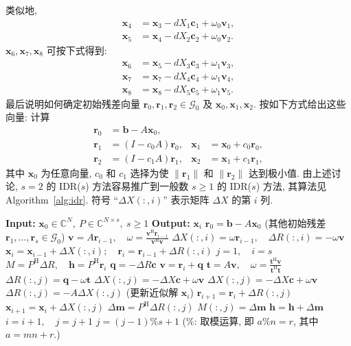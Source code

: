 {类似地,}
\[\begin{aligned}\bm x_4&=\bm x_3-dX_1\bm c_1+\omega_0\bm v_1,\\\bm x_5&=\bm x_4-dX_2\bm c_2+\omega_0\bm v_2.\end{aligned}\]
{$\bm x_6,\bm x_7,\bm x_8$ 可按下式得到:}
\[\begin{aligned}\bm x_6&=\bm x_5-dX_3\bm c_3+\omega_1\bm v_3,\\\bm x_7&=\bm x_7-dX_4\bm c_4+\omega_1\bm v_4,\\\bm x_8&=\bm x_8-dX_5\bm c_5+\omega_1\bm v_5.\end{aligned}\]
{最后说明如何确定初始残差向量 $\bm r_0,\bm r_1,\bm r_2\in\mathcal G_0$ 及 $\bm x_0,\bm x_1,\bm x_2$. 按如下方式给出这些向量: 计算}
\[\begin{aligned}\bm r_0&=\bm b-A\bm x_0,\\\bm r_1&=(I-c_0A)\bm r_0,&\bm x_1&=\bm x_0+c_0\bm r_0,\\\bm r_2&=(I-c_1A)\bm r_1,&\bm x_2&=\bm x_1+c_1\bm r_1,\end{aligned}\]
{其中 $\bm x_0$ 为任意向量, $c_0$ 和 $c_1$ 选择为使 $\|\bm r_1\|$ 和 $\|\bm r_2\|$ 达到极小值.}
{由上述讨论, $s=2$ 的 IDR($s$) 方法容易推广到一般数 $s\ge1$ 的 IDR($s$) 方法, 其算法见 Algorithm\ \ref{alg:idr}. 符号 ``$\Delta X(:,i)$'' 表示矩阵 $\Delta X$ 的第 $i$ 列.}
\begin{algorithm}[H]\caption{{IDR($s$) 方法}}\label{alg:idr}\begin{algorithmic}[1]
\Statex\textbf{Input:} $\bm x_0\in\mathbb C^N,\ P\in\mathbb C^{N\times s},\ s\ge1$
\Statex\textbf{Output:} $\bm x_i$
\State $\bm r_0=\bm b-A\bm x_0$
\Statex ({其他初始残差 $\bm r_1,\ldots,\bm r_s\in\mathcal G_0$})
\State $\bm v=A\bm r_{i-1},\quad\omega=\frac{\bm v^{\mathrm H}\bm r_{i-1}}{\bm v^{\mathrm H}\bm v}$
\State $\Delta X(:,i)=\omega\bm r_{i-1},\quad\Delta R(:,i)=-\omega\bm v$
\State $\bm x_i=\bm x_{i-1}+\Delta X(:,i);\quad\bm r_i=\bm r_{i-1}+\Delta R(:,i)$
\EndFor
\State $j=1,\quad i=s$
\State $M=P^{\mathrm H}\Delta R,\quad\bm h=P^{\mathrm H}\bm r_i$
\State $\bm q=-\Delta R\bm c$
\State $\bm v=\bm r_i+\bm q$
\State $\bm t=A\bm v,\quad\omega=\frac{\bm t^{\mathrm H}\bm v}{\bm t^{\mathrm H}\bm t}$
\State $\Delta R(:,j)=\bm q-\omega\bm t$
\State $\Delta X(:,j)=-\Delta X\bm c+\omega\bm v$
\Else
\State $\Delta X(:,j)=-\Delta X\bm c+\omega\bm v$
\State $\Delta R(:,j)=-A\Delta X(:,j)$
\EndIf
\Statex ({更新近似解 $\bm x_i$})
\State $\bm r_{i+1}=\bm r_i+\Delta R(:,j)$
\State $\bm x_{i+1}=\bm x_i+\Delta X(:,j)$
\State $\Delta\bm m=P^{\mathrm H}\Delta R(:,j)$
\State $M(:,j)=\Delta\bm m$
\State $\bm h=\bm h+\Delta\bm m$
\State $i=i+1,\quad j=j+1$
\State $j=(j-1)\%s+1$ ({$\%$: 取模运算, 即 $a\%n=r$, 其中 $a=mn+r$.})
\EndFor\EndWhile\end{algorithmic}\end{algorithm}
